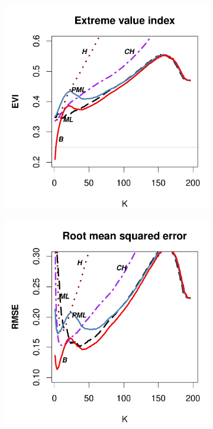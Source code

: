 	\begin{figure}[h]
		\centering
		\begin{subfigure}[h]{0.40\linewidth}
			\includegraphics[width=\textwidth]{./plots/paper1/EVI_OutputGEV0,25200.pdf}
		\end{subfigure}
		\hspace{\fill}
		\begin{subfigure}[h]{0.40\linewidth}
			\includegraphics[width=\textwidth]{./plots/paper1/RMSE_OutputGEV0,25200.pdf}

\end{subfigure}
\end{figure}
